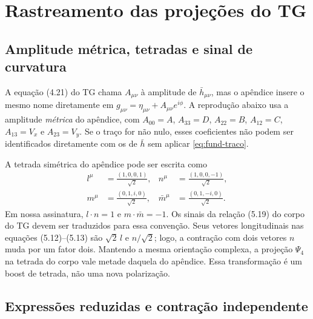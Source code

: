 \section{Rastreamento das projeções do TG}

\subsection{Amplitude métrica, tetradas e sinal de curvatura}

A equação (4.21) do TG chama \(A_{\mu\nu}\) à amplitude de
\(\bar h_{\mu\nu}\), mas o apêndice insere o mesmo nome diretamente
em \(g_{\mu\nu}=\eta_{\mu\nu}+A_{\mu\nu}e^{i\phi}\).
A reprodução abaixo usa a amplitude \emph{métrica} do apêndice, com
\(A_{00}=A\), \(A_{33}=D\), \(A_{22}=B\), \(A_{12}=C\),
\(A_{13}=V_x\) e \(A_{23}=V_y\). Se o traço for não nulo, esses
coeficientes não podem ser identificados diretamente com os de
\(\bar h\) sem aplicar \eqref{eq:fund-traco}.

A tetrada simétrica do apêndice pode ser escrita como
\begin{equation}
 \begin{aligned}
 l^\mu&=\frac{(1,0,0,1)}{\sqrt2},
 &n^\mu&=\frac{(1,0,0,-1)}{\sqrt2},\\
 m^\mu&=\frac{(0,1,i,0)}{\sqrt2},
 &\bar m^\mu&=\frac{(0,1,-i,0)}{\sqrt2}.
 \end{aligned}
 \label{eq:fund-tetrada}
\end{equation}
Em nossa assinatura, \(l\cdot n=1\) e
\(m\cdot\bar m=-1\). Os sinais da relação (5.19) do corpo do TG
devem ser traduzidos para essa convenção. Seus vetores longitudinais
nas equações (5.12)--(5.13) são \(\sqrt2\,l\) e
\(n/\sqrt2\); logo, a contração com dois vetores \(n\) muda por
um fator dois. Mantendo a mesma orientação complexa, a projeção
\(\Psi_4\) na tetrada do corpo vale metade daquela do apêndice.
Essa transformação é um boost de tetrada, não uma nova polarização.

\subsection{Expressões reduzidas e contração independente}

